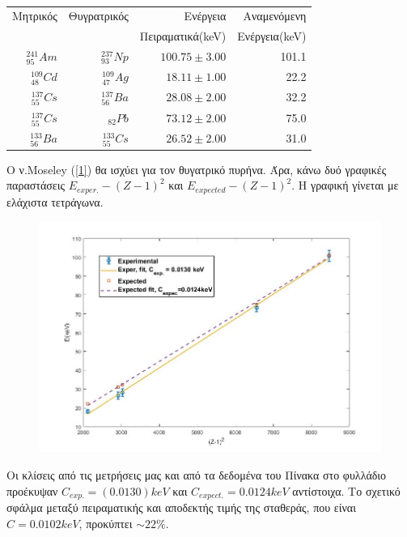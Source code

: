 \documentclass[a4paper]{article}
\begin{document}
		\begin{table}[h!]
			\centering
			\begin{tabular}{|r|r|r|r|}\hline	
				Μητρικός & Θυγρατρικός & Ενέργεια         & Αναμενόμενη  \\
				         &             & Πειραματικά(keV) & Ενέργεια(keV)\\\hline\hline
				$^{241}_{95}Am$ & $^{237}_{93}Np$ &  $100.75\pm3.00$  &  101.1 \\\hline
				$^{109}_{48}Cd$ & $^{109}_{47}Ag$ &  $18.11\pm1.00 $  &  22.2  \\\hline
				$^{137}_{55}Cs$ & $^{137}_{56}Ba$ &  $28.08\pm2.00 $  &  32.2  \\\hline
				$^{137}_{55}Cs$ & $_{82}Pb$       &  $73.12\pm2.00 $  &  75.0  \\\hline
				$^{133}_{56}Ba$ & $^{133}_{55}Cs$ &  $26.52\pm2.00 $  &  31.0  \\\hline
			\end{tabular}					
			\caption{ }
			\label{mat2}
		\end{table}
		
		Ο ν.Moseley (\ref{1}) θα ισχύει για τον θυγατρικό πυρήνα. Άρα, κάνω δυό γραφικές παραστάσεις $E_{exper.} - (Z-1)^2 $ και $E_{expected} - (Z-1)^2$. Η γραφική γίνεται με ελάχιστα τετράγωνα.
		\begin{figure}[h!]
			\centering
			\includegraphics[scale=0.6]{moseley.jpg}
			\caption{ }
			\label{im3}
		\end{figure}
		
		Οι κλίσεις από τις μετρήσεις μας και από τα δεδομένα του Πίνακα στο φυλλάδιο προέκυψαν $C_{exp.}=(0.0130)keV$ και $C_{expect.}=0.0124keV$ αντίστοιχα. Το σχετικό σφάλμα μεταξύ πειραματικής και αποδεκτής τιμής της σταθεράς, που είναι $C=0.0102keV$, προκύπτει $\sim22\%$.
		
\end{document}
